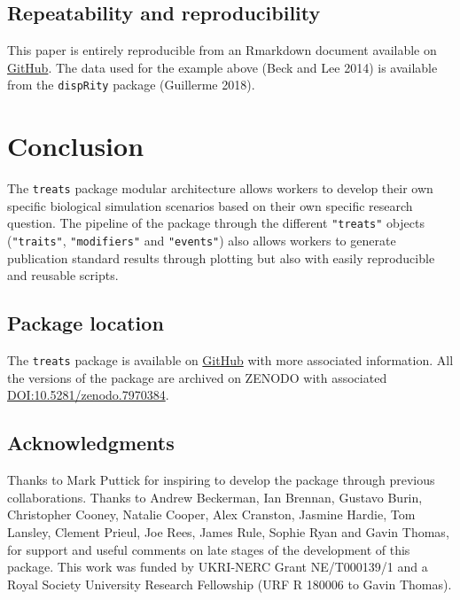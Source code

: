 \documentclass[
]{article}
\begin{document}
\hypertarget{repeatability-and-reproducibility}{%
\subsection{Repeatability and
reproducibility}\label{repeatability-and-reproducibility}}

This paper is entirely reproducible from an Rmarkdown document available
on \href{https://github.com/TGuillerme/treats/paper/}{GitHub}. The data
used for the example above (Beck and Lee 2014) is available from the
\texttt{dispRity} package (Guillerme 2018).

\hypertarget{conclusion}{%
\section{Conclusion}\label{conclusion}}

The \texttt{treats} package modular architecture allows workers to
develop their own specific biological simulation scenarios based on
their own specific research question. The pipeline of the package
through the different \texttt{"treats"} objects (\texttt{"traits"},
\texttt{"modifiers"} and \texttt{"events"}) also allows workers to
generate publication standard results through plotting but also with
easily reproducible and reusable scripts.

\hypertarget{package-location}{%
\subsection{Package location}\label{package-location}}

The \texttt{treats} package is available on
\href{https://github.com/TGuillerme/treats}{GitHub} with more associated
information. All the versions of the package are archived on ZENODO with
associated
\href{https://doi.org/10.5281/zenodo.7970384}{DOI:10.5281/zenodo.7970384}.

\hypertarget{acknowledgments}{%
\subsection{Acknowledgments}\label{acknowledgments}}

Thanks to Mark Puttick for inspiring to develop the package through
previous collaborations. Thanks to Andrew Beckerman, Ian Brennan,
Gustavo Burin, Christopher Cooney, Natalie Cooper, Alex Cranston,
Jasmine Hardie, Tom Lansley, Clement Prieul, Joe Rees, James Rule,
Sophie Ryan and Gavin Thomas, for support and useful comments on late
stages of the development of this package. This work was funded by
UKRI-NERC Grant NE/T000139/1 and a Royal Society University Research
Fellowship (URF R 180006 to Gavin Thomas).
\end{document}

